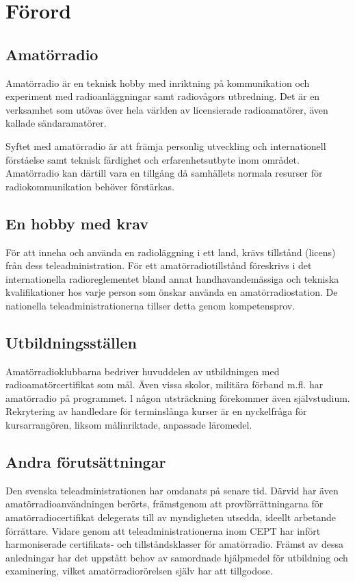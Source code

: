 
\chapter*{Förord}

\section*{Amatörradio}

Amatörradio är en teknisk hobby med inriktning på kommunikation och experiment med
radioanläggningar samt radiovågors utbredning. Det är en verksamhet som utövas över
hela världen av licensierade radioamatörer, även kallade sändaramatörer.

Syftet med amatörradio är att främja personlig utveckling och internationell förståelse
samt teknisk färdighet och erfarenhetsutbyte inom området. Amatörradio kan därtill vara
en tillgång då samhällets normala resurser för radiokommunikation behöver förstärkas.

\section*{En hobby med krav}

För att inneha och använda en radioläggning i ett land, krävs tillstånd (licens) från
dess teleadministration. För ett amatörradiotillstånd föreskrivs i det internationella
radioreglementet bland annat handhavandemässiga och tekniska kvalifikationer hos
varje person som önskar använda en amatörradiostation. De nationella teleadministrationerna tillser detta genom kompetensprov.

\section*{Utbildningsställen}

Amatörradioklubbarna bedriver huvuddelen
av utbildningen med radioamatörcertifikat
som mål. Även vissa skolor, militära förband
m.fl. har amatörradio på programmet. l någon utsträckning förekommer även självstudium. Rekrytering av handledare för terminslånga kurser är en nyckelfråga för kursarrangören, liksom målinriktade, anpassade läromedel.

\section*{Andra förutsättningar}

Den svenska teleadministrationen har omdanats på senare tid. Därvid har även amatörradioanvändningen berörts, främstgenom
att provförrättningarna för amatörradiocertifikat delegerats till av myndigheten utsedda,
ideellt arbetande förrättare. Vidare genom
att teleadministrationerna inom CEPT har
infört harmoniserade certifikats- och tillståndsklasser för amatörradio.
Främst av dessa anledningar har det
uppstått behov av samordnade hjälpmedel
för utbildning och examinering, vilket amatörradiorörelsen själv har att tillgodose.

